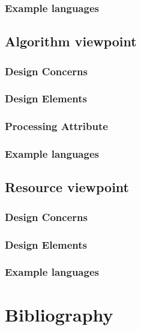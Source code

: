 \documentclass[onecolumn, draftclsnofoot,10pt, compsoc]{IEEEtran}
\begin{document}
\begin{singlespace}
		\subsubsection{Example languages}
	\subsection{Algorithm viewpoint}
		\subsubsection{Design Concerns}
		\subsubsection{Design Elements}
		\subsubsection{Processing Attribute}
		\subsubsection{Example languages}
	\subsection{Resource viewpoint}
		\subsubsection{Design Concerns}
		\subsubsection{Design Elements}
		\subsubsection{Example languages}

\section{Bibliography}
	
	

\end{singlespace}
\end{document}
